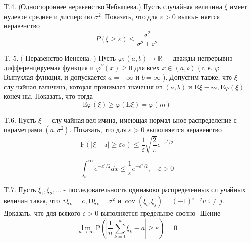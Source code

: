 \documentclass[a4paper,12pt]{article} %
\begin{document}
\begin{example}


T.4. (Одностороннее неравенство Чебышева.) Пусть случайная величина $\xi$ имеет нулевое среднее и дисперсию $\sigma^{2} .$ Показать, что для $\varepsilon>0$ выпол-
няется неравенство
$$
P(\xi \geq \varepsilon) \leq \frac{\sigma^{2}}{\sigma^{2}+\varepsilon^{2}}
$$



\end{example}







\begin{example}


T. 5. $($ Неравенство Иенсена. $)$ Пусть $\varphi:(a, b) \rightarrow \mathbb{R}-$ дважды непрерывно дифференцируемая функция и $\varphi^{\prime \prime}(x) \geq 0$ для всех $x \in(a, b)$ (т. е. $\varphi$ Выпуклая функция, и допускается $a=-\infty$ и $b=\infty$ ). Допустим также, что $\xi-$ слу чайная величина, которая принимает значения из $(a, b)$ и $\mathrm{E} \xi=m, \mathrm{E} \varphi(\xi)$ конеч ны. Показать, что тогда
$$
\mathrm{E} \varphi(\xi) \geq \varphi(\mathrm{E} \xi)=\varphi(m)
$$



\end{example}



\begin{example}



T.6. Пусть $\xi-$ слу чайная вел ичина, имеющая нормал ьное распределение с параметрами $\left(a, \sigma^{2}\right) .$ Показать, что для $\varepsilon>0$ выполняется неравенство
$$
\mathrm{P}(|\xi-a| \geq \varepsilon \sigma) \leq \frac{1}{\varepsilon} \sqrt{\frac{2}{\pi}} e^{-\varepsilon^{2} / 2}
$$

$$\int_{\varepsilon}^{\infty} e^{-x^{2} / 2} d x \leq \frac{1}{\varepsilon} e^{-\varepsilon^{2} / 2}, \quad \varepsilon>0$$

\end{example}



\begin{example}

T.7. Пусть $\xi_{1}, \xi_{2}, \ldots$ - последовательность одинаково распределенных сл учайных величин такая, что $\mathrm{E} \xi_{k}=a, \mathrm{D} \xi_{k}=\sigma^{2}$ и $\operatorname{cov}\left(\xi_{i}, \xi_{j}\right)=(-1)^{i-j} v$
$i \neq j .$ Доказать, что для всякого $\varepsilon>0$ выполняется предельное соотно-
Шение
$$
\lim _{n \rightarrow \infty} \mathrm{P}\left(\left|\frac{1}{n} \sum_{k=1}^{n} \xi_{k}-a\right| \geq \varepsilon\right)=0
$$




\end{example}
\end{document}
